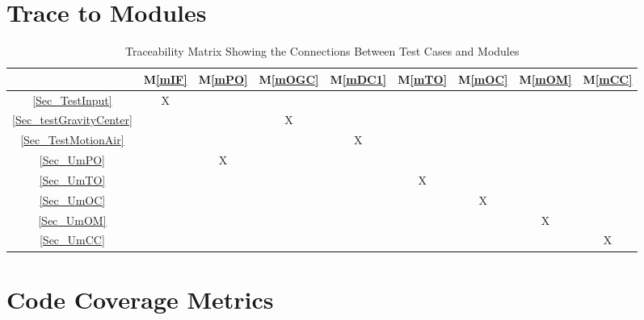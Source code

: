 \documentclass[12pt, titlepage]{article}
\newcommand{\mref}[1]{M\ref{#1}}
\begin{document}
\section{Trace to Modules}		

\begin{table}[h!]
	\centering
	\begin{tabular}{|c|c|c|c|c|c|c|c|c|}
		\hline
		& \mref{mIF} & \mref{mPO} & \mref{mOGC}& \mref{mDC1} &\mref{mTO} &\mref{mOC}&\mref{mOM}&\mref{mCC}\\
		\hline
		\ref{Sec_TestInput}&X & & & & & & &\\ \hline
		\ref{Sec_testGravityCenter} & & &X & & & & &\\ \hline
		\ref{Sec_TestMotionAir} & & & &X & & & &\\ \hline
		\ref{Sec_UmPO} & &X & & & & & &\\ \hline
		\ref{Sec_UmTO} & & & & &X & & &\\ \hline
		\ref{Sec_UmOC} & & & & & &X & &\\ \hline
		\ref{Sec_UmOM} & & & & & & &X &\\ \hline
		\ref{Sec_UmCC} & & & & & & & &X\\ \hline
	\end{tabular}
	\caption{Traceability Matrix Showing the Connections Between Test Cases and Modules}
	\label{Table:inputTest3}
\end{table}

\section{Code Coverage Metrics}




\end{document}
